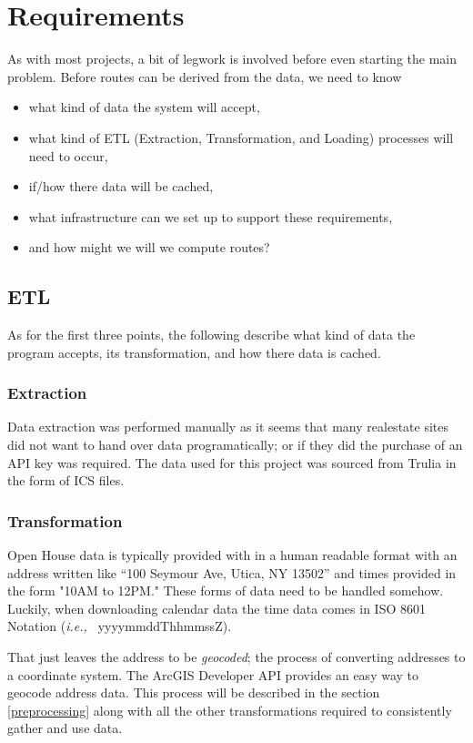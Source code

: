 \documentclass[11 pt]{IEEEtran}
\theoremstyle{definition}
\theoremstyle{definition}
\def\ie{{i.e.,}\ }
\begin{document}
\section{Requirements}
As with most projects, a bit of legwork is involved before even starting the main problem. Before routes can be derived from the data, we need to know
\begin{itemize}
  \item what kind of data the system will accept,
  \item what kind of ETL (Extraction, Transformation, and Loading) processes will need to occur,
  \item if/how there data will be cached,
  \item what infrastructure can we set up to support these requirements,
  \item and how might we will we compute routes?
\end{itemize}

\subsection{ETL}
As for the first three points, the following describe what kind of data the program accepts, its transformation, and how there data is cached.

\subsubsection{Extraction}\label{E}
Data extraction was performed manually as it seems that many realestate sites did not want to hand over data programatically; or if they did the purchase of an API key was required. The data used for this project was sourced from Trulia\cite{Trulia} in the form of ICS files\cite{ICS}.

\subsubsection{Transformation}\label{T}
Open House data is typically provided with in a human readable format with an address written like ``100 Seymour Ave, Utica, NY 13502'' and times provided in the form "10AM to 12PM." These forms of data need to be handled somehow. Luckily, when downloading calendar data the time data comes in ISO 8601 Notation (\emph{\ie} yyyymmddThhmmssZ).

That just leaves the address to be \emph{geocoded}; the process of converting addresses to a coordinate system. The ArcGIS Developer API provides an easy way to geocode address data. This process will be described in the section \ref{preprocessing} along with all the other transformations required to consistently gather and use data.
 
\end{document}
